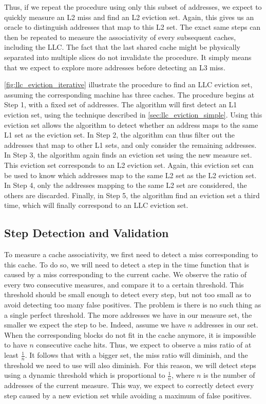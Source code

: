 \documentclass[a4paper,11pt,oneside]{report}
\begin{document}
Thus, if we repeat the procedure using only this subset of addresses, we expect to quickly measure an L2 miss and find an L2 eviction set. Again, this gives us an oracle to distinguish addresses that map to this L2 set. The exact same steps can then be repeated to measure the associativity of every subsequent caches, including the LLC. The fact that the last shared cache might be physically separated into multiple slices do not invalidate the procedure. It simply means that we expect to explore more addresses before detecting an L3 miss. 

\autoref{fig:llc_eviction_iterative} illustrate the procedure to find an LLC eviction set, assuming the corresponding machine has three caches. The procedure begins at Step 1, with a fixed set of addresses. The algorithm will first detect an L1 eviction set, using the technique described in \autoref{sec:llc_eviction_simple}. Using this eviction set allows the algorithm to detect whether an address maps to the same L1 set as the eviction set. In Step 2, the algorithm can thus filter out the addresses that map to other L1 sets, and only consider the remaining addresses. In Step 3, the algorithm again finds an eviction set using the new measure set. This eviction set corresponds to an L2 eviction set. Again, this eviction set can be used to know which addresses map to the same L2 set as the L2 eviction set. In Step 4, only the addresses mapping to the same L2 set are considered, the others are discarded. Finally, in Step 5, the algorithm find an eviction set a third time, which will finally correspond to an LLC eviction set.

\subsection{Step Detection and Validation}

To measure a cache associativity, we first need to detect a miss corresponding to this cache. To do so, we will need to detect a step in the time function that is caused by a miss corresponding to the current cache. We observe the ratio of every two consecutive measures, and compare it to a certain threshold. This threshold should be small enough to detect every step, but not too small as to avoid detecting too many false positives. The problem is there is no such thing as a single perfect threshold. The more addresses we have in our measure set, the smaller we expect the step to be. Indeed, assume we have $n$ addresses in our set. When the corresponding blocks do not fit in the cache anymore, it is impossible to have $n$ consecutive cache hits. Thus, we expect to observe a miss ratio of at least $\frac{1}{n}$. It follows that with a bigger set, the miss ratio will diminish, and the threshold we need to use will also diminish. For this reason, we will detect steps using a dynamic threshold which is proportional to $\frac{1}{n}$, where $n$ is the number of addresses of the current measure. This way, we expect to correctly detect every step caused by a new eviction set while avoiding a maximum of false positives.
\end{document}
